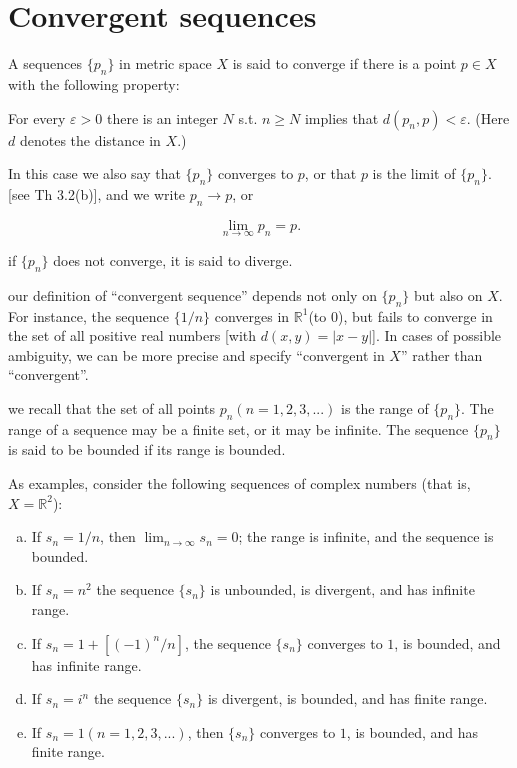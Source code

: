\section{Convergent sequences}

\begin{myDef}\label{myDef:3.1 converge}
    A sequences 
    $\{p_n\}$ 
    in metric space $X$ is said to converge if there is a point $p \in X$ with the following property:
    
    For every $\varepsilon >0$ there is an integer $N$ s.t. $n \geq N$ implies that $d(p_n, p) < \varepsilon$. (Here $d$ denotes the distance in $X$.)

    In this case we also say that $\{p_n\}$ converges to $p$, or that $p$ is the limit of $\{p_n\}$. [see Th 3.2(b)], and we write $p_n \rightarrow p$, or

    \begin{equation*}
        \lim_{n \to \infty} p_n = p.
    \end{equation*}

    if $\{p_n\}$ does not converge, it is said to diverge.
\end{myDef}

our definition of ``convergent sequence'' depends not only on $\{p_n\}$ but also on $X$. For instance, the sequence $\{1/n\}$ converges in $\mathbb{R}^1$(to $0$), but fails to converge in the set of all positive real numbers [with $d(x,y) = |x-y|$]. 
In cases of possible ambiguity, we can be more
precise and specify ``convergent in $X$'' rather than ``convergent''.

we recall that the set of all points $p_n (n=1,2, 3,...)$ is the range of 
$\{p_n\}$.
The range of a sequence may be a finite set, or it may be infinite. The sequence
$\{p_n\}$ is said to be bounded if its range is bounded.

As examples, consider the following sequences of complex numbers
(that is, $X = \mathbb{R}^2$):

\begin{enumerate}[(a)]
    \item If $s_n=1/n$, then $\lim_{n \to \infty} s_n = 0$; the range is infinite, and the sequence is bounded.
    \item If $s_n=n^2$ the sequence $\{s_n\}$ is unbounded, is divergent, and has infinite range.
    \item If $s_n = 1+[(- 1)^n/n]$, the sequence $\{s_n\}$ converges to $1$, is bounded, and has infinite range.
    \item If $s_n =i^n$ the sequence $\{s_n\}$ is divergent, is bounded, and has finite range.
    \item If $s_n = 1(n=1,2,3,...)$, then $\{s_n\}$ converges to $1$, is bounded, and has finite range.
\end{enumerate}

